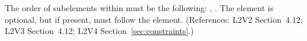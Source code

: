 The order of subelements within \Constraint must be the following:
, .  The  element is optional,
but if present, must follow the  element.  (References: L2V2
Section~4.12; L2V3 Section~4.12; L2V4 Section~\ref{sec:constraints}.)
